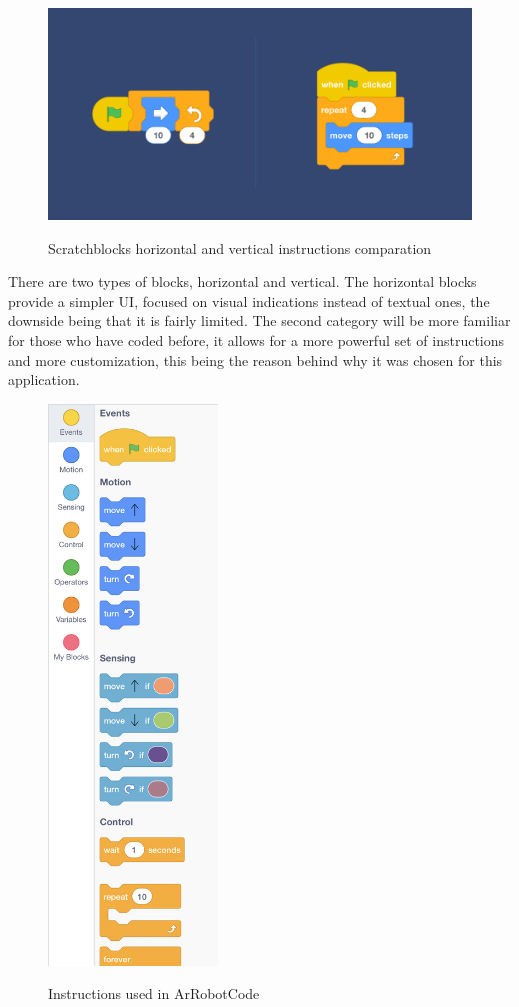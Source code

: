 \documentclass[12 pct]{report}
\begin{document}
\begin{figure}[H]
\includegraphics[width=1.0\textwidth]{scratchblocks}
\centering
\label{fig:hololens}
\caption{Scratchblocks horizontal and vertical instructions comparation}
\end{figure}

There are two types of blocks, horizontal and vertical. The horizontal blocks provide a simpler UI, focused on visual indications instead of textual ones, the downside being that it is fairly limited. The second category will be more familiar for those who have coded before, it allows for a more powerful set of instructions and more customization, this being the reason behind why it was chosen for this application.

\begin{figure}[H]
\includegraphics[width=0.4\textwidth]{allInstructions}
\centering
\label{fig:hololens}
\caption{Instructions used in ArRobotCode}
\end{figure}
\end{document}
